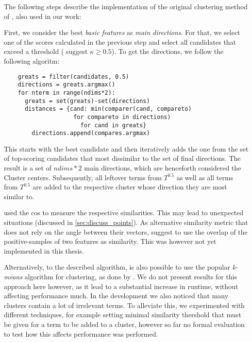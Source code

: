 The following steps describe the implementation of the original clustering method of \textcite{Derrac2015}, also used in our work:

First, we consider the best \textit{basic features} as \textit{main directions}. For that, we select one of the scores calculated in the previous step and select all candidates that exceed a threshold (\cite{Derrac2015} suggest $\kappa \geq 0.5$).
To get the directions, we follow the following algoritm:

\vspace{-1ex}
\begingroup
\verbatimfont{\footnotesize}%
\begin{verbatim}
	greats = filter(candidates, 0.5)
	directions = greats.argmax()
	for nterm in range(ndims*2):
	  greats = set(greats)-set(directions)
	  distances = {cand: min(comparer(cand, compareto) 
	                for compareto in directions) 
	                  for cand in greats}
		directions.append(compares.argmax)
\end{verbatim}
\endgroup
\vspace{-1ex}

This starts with the best candidate and then iteratively adds the one from the set of top-scoring candidates that most dissimilar to the set of final directions. The result is a set of $ndims*2$ main directions, which are henceforth considered the Cluster centers. Subsequently, all leftover terms from $T^{0.5}$ as well as all terms from $T^{0.5}$ are added to the respective cluster whose direction they are most similar to. 

\textcite{Derrac2015} used the \gls{cos} to measure the respective similarities. This may lead to unexpected situations (discussed in \autoref{sec:discuss_points}). As alternative similarity metric that does not rely on the angle between their vectors, \cite{Alshaikh2019} suggest to use the overlap of the positive-samples of two features as similarity. This was however not yet implemented in this thesis.

Alternatively, to the described algorithm, is also possible to use the popular \textit{k-means} algorithm for clustering, as done by \cite{Ager2018}. We do not present results for this approach here however, as it lead to a substantial increase in runtime, without affecting performance much. In the development we also noticed that many clusters contain a lot of irrelevant terms. To alleviate this, we experimented with different techniques, for example setting minimal similarity thershold that must be given for a term to be added to a cluster, however so far no formal evaluation to test how this affects performance was performed.


